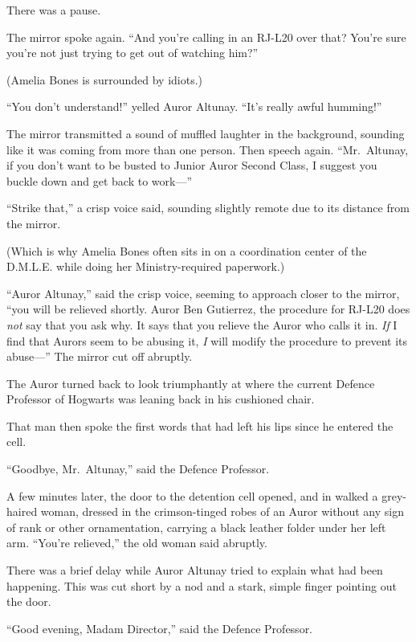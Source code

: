There was a pause.

The mirror spoke again. ``And you're calling in an RJ-L20 over that?
You're sure you're not just trying to get out of watching him?''

(Amelia Bones is surrounded by idiots.)

``You don't understand!'' yelled Auror Altunay. ``It's really awful
humming!''

The mirror transmitted a sound of muffled laughter in the background,
sounding like it was coming from more than one person. Then speech
again. ``Mr.~Altunay, if you don't want to be busted to Junior Auror
Second Class, I suggest you buckle down and get back to work---''

``Strike that,'' a crisp voice said, sounding slightly remote due to its
distance from the mirror.

(Which is why Amelia Bones often sits in on a coordination center of the
D.M.L.E. while doing her Ministry-required paperwork.)

``Auror Altunay,'' said the crisp voice, seeming to approach closer to
the mirror, ``you will be relieved shortly. Auror Ben Gutierrez, the
procedure for RJ-L20 does \emph{not} say that you ask why. It says that
you relieve the Auror who calls it in. \emph{If} I find that Aurors seem
to be abusing it, \emph{I} will modify the procedure to prevent its
abuse---'' The mirror cut off abruptly.

The Auror turned back to look triumphantly at where the current Defence
Professor of Hogwarts was leaning back in his cushioned chair.

That man then spoke the first words that had left his lips since he
entered the cell.

``Goodbye, Mr.~Altunay,'' said the Defence Professor.

A few minutes later, the door to the detention cell opened, and in
walked a grey-haired woman, dressed in the crimson-tinged robes of an
Auror without any sign of rank or other ornamentation, carrying a black
leather folder under her left arm. ``You're relieved,'' the old woman
said abruptly.

There was a brief delay while Auror Altunay tried to explain what had
been happening. This was cut short by a nod and a stark, simple finger
pointing out the door.

``Good evening, Madam Director,'' said the Defence Professor.

